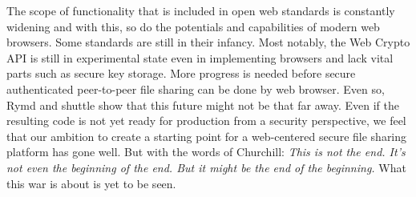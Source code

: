 The scope of functionality that is included in open web standards is constantly widening and with this, so do the potentials and capabilities of modern web browsers. Some standards are still in their infancy. Most notably, the Web Crypto API is still in experimental state even in implementing browsers and lack vital parts such as secure key storage. More progress is needed before secure authenticated peer-to-peer file sharing can be done by web browser. Even so, Rymd and shuttle show that this future might not be that far away. Even if the resulting code is not yet ready for production from a security perspective, we feel that our ambition to create a starting point for a web-centered secure file sharing platform has gone well. But with the words of Churchill: \emph{This is not the end. It's not even the beginning of the end. But it might be the end of the beginning.} What this war is about is yet to be seen.
